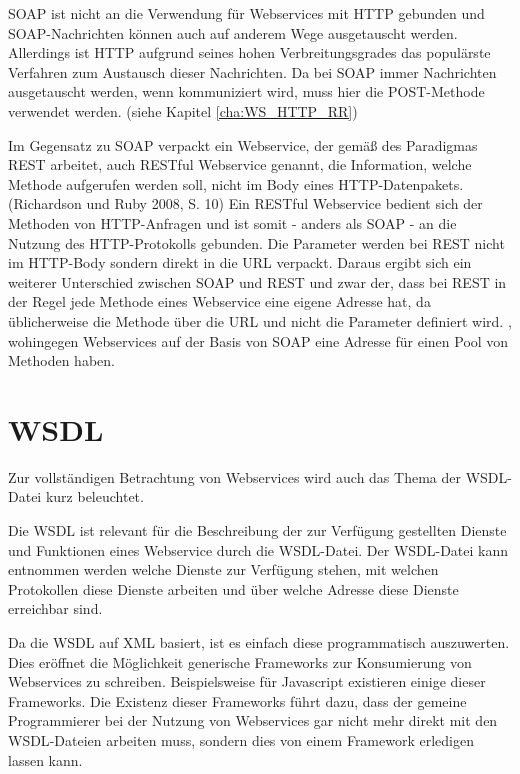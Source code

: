 \ac{SOAP} ist nicht an die Verwendung für Webservices mit \ac{HTTP} gebunden und SOAP-Nachrichten können auch auf anderem Wege ausgetauscht werden. Allerdings ist \ac{HTTP} aufgrund seines hohen Verbreitungsgrades das populärste Verfahren zum Austausch dieser Nachrichten. \cite[S. 37]{Snell.2002} Da bei SOAP immer Nachrichten ausgetauscht werden, wenn kommuniziert wird, muss hier die POST-Methode verwendet werden. (siehe Kapitel \ref{cha:WS_HTTP_RR})

Im Gegensatz zu \ac{SOAP} verpackt ein Webservice, der gemäß des Paradigmas \ac{REST} arbeitet, auch RESTful Webservice genannt, die Information, welche Methode aufgerufen werden soll, nicht im Body eines \ac{HTTP}-Datenpakets. (Richardson und Ruby 2008, S. 10) Ein RESTful Webservice bedient sich der Methoden von \ac{HTTP}-Anfragen \cite[S. 8]{Richardson.2008} und ist somit - anders als SOAP - an die Nutzung des HTTP-Protokolls gebunden.  Die Parameter werden bei REST nicht im HTTP-Body sondern direkt in die URL verpackt. Daraus ergibt sich ein weiterer Unterschied zwischen \ac{SOAP} und \ac{REST} und zwar der, dass bei \ac{REST} in der Regel jede Methode eines Webservice eine eigene Adresse hat, da üblicherweise die Methode über die \ac{URL} und nicht die Parameter definiert wird. \cite[S. 13]{Richardson.2008}, wohingegen Webservices auf der Basis von \ac{SOAP} eine Adresse für einen Pool von Methoden haben. 

\section{WSDL}

Zur vollständigen Betrachtung von Webservices wird auch das Thema der \ac{WSDL}-Datei kurz beleuchtet.

Die \ac{WSDL} ist relevant für die Beschreibung der zur Verfügung gestellten Dienste und Funktionen eines Webservice durch die \ac{WSDL}-Datei. \cite[S. 24]{Burbiel.2007} 
Der \ac{WSDL}-Datei kann entnommen werden welche Dienste zur Verfügung stehen, mit welchen Protokollen diese Dienste arbeiten und über welche Adresse diese Dienste erreichbar sind.

Da die \ac{WSDL} auf \ac{XML} basiert, ist es einfach diese programmatisch auszuwerten. Dies eröffnet die Möglichkeit generische Frameworks zur Konsumierung von Webservices zu schreiben. Beispielsweise für Javascript existieren einige dieser Frameworks. \cite[S. 209]{Jager.2008}
Die Existenz dieser Frameworks führt dazu, dass der gemeine Programmierer bei der Nutzung von Webservices gar nicht mehr direkt mit den \ac{WSDL}-Dateien arbeiten muss, sondern dies von einem Framework erledigen lassen kann. 


